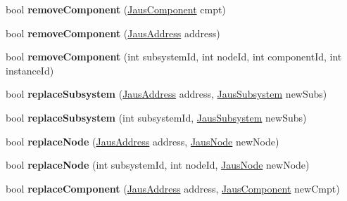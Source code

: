 \begin{DoxyCompactItemize}
\item 
\hypertarget{class_system_tree_aa253ee30078ec76a216a0d05dea11003}{bool {\bfseries remove\-Component} (\hyperlink{struct_jaus_component_struct}{\-Jaus\-Component} cmpt)}\label{class_system_tree_aa253ee30078ec76a216a0d05dea11003}

\item 
\hypertarget{class_system_tree_a1b33049de25334e69e2984ce188c8503}{bool {\bfseries remove\-Component} (\hyperlink{struct_jaus_address_struct}{\-Jaus\-Address} address)}\label{class_system_tree_a1b33049de25334e69e2984ce188c8503}

\item 
\hypertarget{class_system_tree_a7529ca879ea633307892eb0c913b21ac}{bool {\bfseries remove\-Component} (int subsystem\-Id, int node\-Id, int component\-Id, int instance\-Id)}\label{class_system_tree_a7529ca879ea633307892eb0c913b21ac}

\item 
\hypertarget{class_system_tree_acaf0d7821b87e552a01ecfcaaa813846}{bool {\bfseries replace\-Subsystem} (\hyperlink{struct_jaus_address_struct}{\-Jaus\-Address} address, \hyperlink{struct_jaus_subsystem_struct}{\-Jaus\-Subsystem} new\-Subs)}\label{class_system_tree_acaf0d7821b87e552a01ecfcaaa813846}

\item 
\hypertarget{class_system_tree_aa150425dbe714a4de37ca6259030d1d0}{bool {\bfseries replace\-Subsystem} (int subsystem\-Id, \hyperlink{struct_jaus_subsystem_struct}{\-Jaus\-Subsystem} new\-Subs)}\label{class_system_tree_aa150425dbe714a4de37ca6259030d1d0}

\item 
\hypertarget{class_system_tree_a33cdc2fd39322c4aaa546a5a1dd14530}{bool {\bfseries replace\-Node} (\hyperlink{struct_jaus_address_struct}{\-Jaus\-Address} address, \hyperlink{struct_jaus_node_struct}{\-Jaus\-Node} new\-Node)}\label{class_system_tree_a33cdc2fd39322c4aaa546a5a1dd14530}

\item 
\hypertarget{class_system_tree_ae954a7ee2ea5b629ef5c4b7000547a36}{bool {\bfseries replace\-Node} (int subsystem\-Id, int node\-Id, \hyperlink{struct_jaus_node_struct}{\-Jaus\-Node} new\-Node)}\label{class_system_tree_ae954a7ee2ea5b629ef5c4b7000547a36}

\item 
\hypertarget{class_system_tree_a7055cedd643c898c65321d22e5ff0ceb}{bool {\bfseries replace\-Component} (\hyperlink{struct_jaus_address_struct}{\-Jaus\-Address} address, \hyperlink{struct_jaus_component_struct}{\-Jaus\-Component} new\-Cmpt)}\label{class_system_tree_a7055cedd643c898c65321d22e5ff0ceb}


\end{DoxyCompactItemize}
